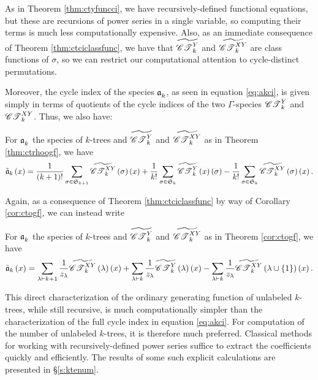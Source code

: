 \documentclass[distribution,draft]{brandiss} %
\numberwithin{section}{chapter}
\numberwithin{figure}{chapter}
\begin{document}
As in Theorem \ref{thm:ctyfuncci}, we have recursively-defined functional equations, but these are recursions of power series in a single variable, so computing their terms is much less computationally expensive.
Also, as an immediate consequence of Theorem \ref{thm:ctciclassfunc}, we have that $\widetilde{\mathscr{CT}_{k}^{Y}}$ and $\widetilde{\mathscr{CT}_{k}^{XY}}$ are class functions of $\sigma$, so we can restrict our computational attention to cycle-distinct permutations.

Moreover, the cycle index of the species $\mathfrak{a}_{k}^{}$, as seen in equation \eqref{eq:akci}, is given simply in terms of quotients of the cycle indices of the two $\Gamma$-species $\mathscr{CT}_{k}^{Y}$ and $\mathscr{CT}_{k}^{XY}$.
Thus, we also have:
\begin{theorem}
  \label{thm:akrhoogf}
  For $\mathfrak{a}_{k}^{}$ the species of $k$-trees and $\widetilde{\mathscr{CT}_{k}^{Y}}$ and $\widetilde{\mathscr{CT}_{k}^{XY}}$ as in Theorem \ref{thm:ctrhoogf}, we have
  \begin{equation}
    \label{eq:akrhoogf}
    \tilde{\mathfrak{a}}_{k} \left( {x} \right) = \frac{1}{\left( {k+1} \right)!} \sum_{\sigma \in  \mathfrak{S}_{k+1} } \widetilde{\mathscr{CT}_{k}^{XY}} \left( {\sigma} \right) \left( {x} \right) + \frac{1}{k!} \sum_{\sigma \in  \mathfrak{S}_{k} } \widetilde{\mathscr{CT}_{k}^{Y}} \left( {x} \right) \left( {\sigma} \right) - \frac{1}{k!} \sum_{\sigma \in  \mathfrak{S}_{k} } \widetilde{\mathscr{CT}_{k}^{XY}} \left( {\sigma} \right) \left( {x} \right).
  \end{equation}
\end{theorem}

Again, as a consequence of Theorem \ref{thm:ctciclassfunc} by way of Corollary \ref{cor:ctogf}, we can instead write
\begin{corollary}
  For $\mathfrak{a}_{k}^{}$ the species of $k$-trees and $\widetilde{\mathscr{CT}_{k}^{Y}}$ and $\widetilde{\mathscr{CT}_{k}^{XY}}$ as in Theorem \ref{cor:ctogf}, we have
  \begin{equation}
    \label{eq:akogf}
    \tilde{\mathfrak{a}}_{k} \left( {x} \right) = \sum_{\lambda \vdash k+1} \frac{1}{z_{\lambda}} \widetilde{\mathscr{CT}_{k}^{XY}} \left( {\lambda} \right) \left( {x} \right) + \sum_{\lambda \vdash k} \frac{1}{z_{\lambda}} \widetilde{\mathscr{CT}_{k}^{Y}} \left( {\lambda} \right) \left( {x} \right) - \sum_{\lambda \vdash k} \frac{1}{z_{\lambda}} \widetilde{\mathscr{CT}_{k}^{XY}} \left( {\lambda \cup \left\{ {1} \right\}} \right) \left( {x} \right).
  \end{equation}
\end{corollary}

This direct characterization of the ordinary generating function of unlabeled $k$-trees, while still recursive, is much computationally simpler than the characterization of the full cycle index in equation \eqref{eq:akci}.
For computation of the number of unlabeled $k$-trees, it is therefore much preferred.
Classical methods for working with recursively-defined power series suffice to extract the coefficients quickly and efficiently.
The results of some such explicit calculations are presented in \S \ref{s:ktenum}.
\end{document}
